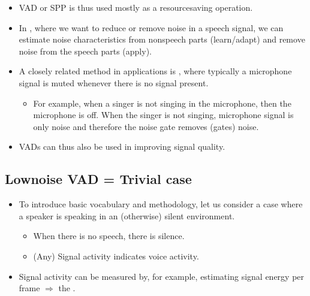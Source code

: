 \documentclass[letterpaper,10pt,english]{jupyterBook}
\begin{document}
\begin{itemize}
\item {} 
\sphinxAtStartPar
VAD or SPP is thus used mostly as a resource\sphinxhyphen{}saving operation.

\item {} 
\sphinxAtStartPar
In , where we want to reduce or remove noise in
a speech signal, we can estimate noise characteristics from
non\sphinxhyphen{}speech parts (learn/adapt) and remove noise from the speech
parts (apply).

\item {} 
\sphinxAtStartPar
A closely related method in  applications is ,
where typically a microphone signal is muted whenever there is no
signal present.
\begin{itemize}
\item {} 
\sphinxAtStartPar
For example, when a singer is not singing in the microphone,
then the microphone is off. When the singer is not singing,
microphone signal is only noise and therefore the noise gate
removes (gates) noise.

\end{itemize}

\item {} 
\sphinxAtStartPar
VADs can thus also be used in improving signal quality.

\end{itemize}


\subsection{Low\sphinxhyphen{}noise VAD = Trivial case}
\label{\detokenize{Recognition/Voice_activity_detection:low-noise-vad-trivial-case}}
\sphinxAtStartPar
{}
\begin{itemize}
\item {} 
\sphinxAtStartPar
To introduce basic vocabulary and methodology, let us consider a
case where a speaker is speaking in an (otherwise) silent
environment.
\begin{itemize}
\item {} 
\sphinxAtStartPar
When there is no speech, there is silence.

\item {} 
\sphinxAtStartPar
(Any) Signal activity indicates voice activity.

\end{itemize}

\item {} 
\sphinxAtStartPar
Signal activity can be measured by, for example, estimating signal
energy per frame \(\Rightarrow\) the .

\end{itemize}
\end{document}
